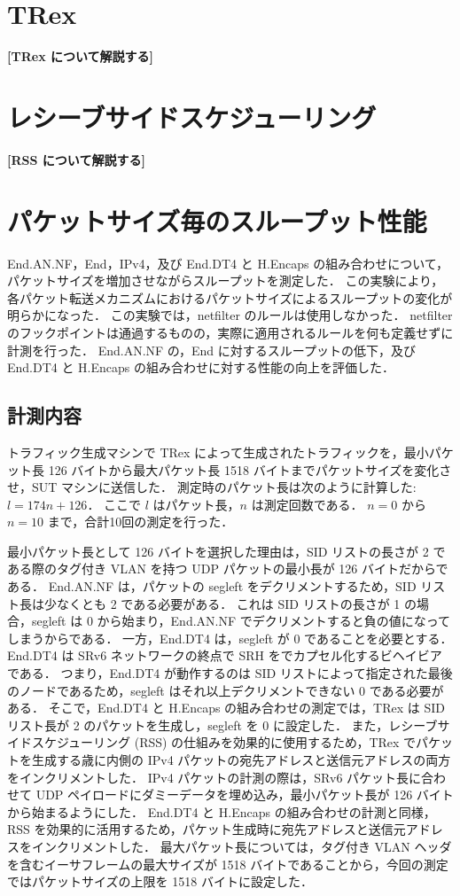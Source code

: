 \section{TRex}
\label{sec:trex}
\textbf{[TRex について解説する]}

\section{レシーブサイドスケジューリング}
\label{sec:rss}
\textbf{[RSS について解説する]}

\section{パケットサイズ毎のスループット性能}
\label{sec:eval.thru-size}
End.AN.NF，End，IPv4，及び End.DT4 と H.Encaps の組み合わせについて，パケットサイズを増加させながらスループットを測定した．
この実験により，各パケット転送メカニズムにおけるパケットサイズによるスループットの変化が明らかになった．
この実験では，netfilter のルールは使用しなかった．
netfilter のフックポイントは通過するものの，実際に適用されるルールを何も定義せずに計測を行った．
End.AN.NF の，End に対するスループットの低下，及び End.DT4 と H.Encaps の組み合わせに対する性能の向上を評価した．

\subsection{計測内容}
\label{ssec:thru-size.summary}
トラフィック生成マシンで TRex によって生成されたトラフィックを，最小パケット長 126 バイトから最大パケット長 1518 バイトまでパケットサイズを変化させ，SUT マシンに送信した．
測定時のパケット長は次のように計算した: $l=174n+126$．
ここで $l$ はパケット長，$n$ は測定回数である．
$n=0$ から $n=10$ まで，合計10回の測定を行った．

最小パケット長として 126 バイトを選択した理由は，SID リストの長さが 2 である際のタグ付き VLAN を持つ UDP パケットの最小長が 126 バイトだからである．
End.AN.NF は，パケットの segleft をデクリメントするため，SID リスト長は少なくとも 2 である必要がある．
これは SID リストの長さが 1 の場合，segleft は 0 から始まり，End.AN.NF でデクリメントすると負の値になってしまうからである．
一方，End.DT4 は，segleft が 0 であることを必要とする．
End.DT4 は SRv6 ネットワークの終点で SRH をでカプセル化するビヘイビアである．
つまり，End.DT4 が動作するのは SID リストによって指定された最後のノードであるため，segleft はそれ以上デクリメントできない 0 である必要がある．
そこで，End.DT4 と H.Encaps の組み合わせの測定では，TRex は SID リスト長が 2 のパケットを生成し，segleft を 0 に設定した．
また，レシーブサイドスケジューリング (RSS) の仕組みを効果的に使用するため，TRex でパケットを生成する歳に内側の IPv4 パケットの宛先アドレスと送信元アドレスの両方をインクリメントした．
IPv4 パケットの計測の際は，SRv6 パケット長に合わせて UDP ペイロードにダミーデータを埋め込み，最小パケット長が 126 バイトから始まるようにした．
End.DT4 と H.Encaps の組み合わせの計測と同様，RSS を効果的に活用するため，パケット生成時に宛先アドレスと送信元アドレスをインクリメントした．
最大パケット長については，タグ付き VLAN ヘッダを含むイーサフレームの最大サイズが 1518 バイトであることから，今回の測定ではパケットサイズの上限を 1518 バイトに設定した．

